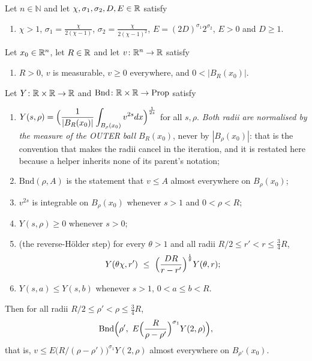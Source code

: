 \begin{helper}
Let $n\in\mathbb{N}$ and let $\chi,\sigma_1,\sigma_2,D,E\in\mathbb{R}$ satisfy
\begin{enumerate}
\item[(H1)] $\chi>1$, $\displaystyle\sigma_1=\frac\chi{2(\chi-1)}$,
  $\displaystyle\sigma_2=\frac\chi{2(\chi-1)^2}$,
  $E=(2D)^{\sigma_1}2^{\sigma_2}$, $E>0$ and $D\ge1$.
\end{enumerate}
Let $x_0\in\mathbb{R}^n$, let $R\in\mathbb{R}$ and let $v\colon\mathbb{R}^n\to\mathbb{R}$ satisfy
\begin{enumerate}
\item[(H2)] $R>0$, $v$ is measurable, $v\ge0$ everywhere, and
  $0<|B_R(x_0)|$.
\end{enumerate}
Let $Y\colon\mathbb{R}\times\mathbb{R}\to\mathbb{R}$ and $\mathrm{Bnd}\colon\mathbb{R}\times\mathbb{R}\to\mathrm{Prop}$
satisfy
\begin{enumerate}
\item[(H3)] $\displaystyle Y(s,\rho)=\Bigl(\frac1{|B_R(x_0)|}
  \int_{B_\rho(x_0)}v^{2s}dx\Bigr)^{\frac1{2s}}$ for all $s,\rho$.
  \emph{Both radii are normalised by the measure of the OUTER ball
  $B_R(x_0)$}, never by $|B_\rho(x_0)|$: that is the convention that makes the
  radii cancel in the iteration, and it is restated here because a helper
  inherits none of its parent's notation;
\item[(H4)] $\mathrm{Bnd}(\rho,A)$ is the statement that $v\le A$ almost
  everywhere on $B_\rho(x_0)$;
\item[(H5)] $v^{2s}$ is integrable on $B_\rho(x_0)$ whenever $s>1$ and
  $0<\rho<R$;
\item[(H6)] $Y(s,\rho)\ge0$ whenever $s>0$;
\item[(H7)] (the reverse-H\"older step) for every $\theta>1$ and all radii
  $R/2\le r'<r\le\frac34R$,
  \[
  Y(\theta\chi,r')\ \le\ \Bigl(\frac{DR}{r-r'}\Bigr)^{\frac1\theta}Y(\theta,r);
  \]
\item[(H8)] $Y(s,a)\le Y(s,b)$ whenever $s>1$, $0<a\le b<R$.
\end{enumerate}
Then for all radii $R/2\le\rho'<\rho\le\frac34R$,
\[
\mathrm{Bnd}\Bigl(\rho',\ E\Bigl(\frac R{\rho-\rho'}\Bigr)^{\sigma_1}Y(2,\rho)\Bigr),
\]
that is, $v\le E\bigl(R/(\rho-\rho')\bigr)^{\sigma_1}Y(2,\rho)$ almost
everywhere on $B_{\rho'}(x_0)$.
\end{helper}

